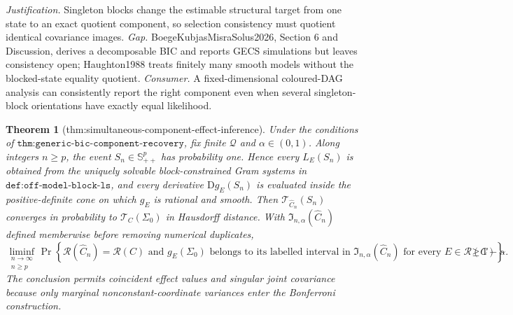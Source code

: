 \documentclass{article}
\newtheorem{theorem}{Theorem}
\begin{document}
\par\smallskip\noindent \textit{Justification.} Singleton blocks change the estimable structural target from one state to an exact quotient component, so selection consistency must quotient identical covariance images. \textit{Gap.} BoegeKubjasMisraSolus2026, Section 6 and Discussion, derives a decomposable BIC and reports GECS simulations but leaves consistency open; Haughton1988 treats finitely many smooth models without the blocked-state equality quotient. \textit{Consumer.} A fixed-dimensional coloured-DAG analysis can consistently report the right component even when several singleton-block orientations have exactly equal likelihood.

\begin{theorem}[thm:simultaneous-component-effect-inference]\label{thm:simultaneous-component-effect-inference}
Under the conditions of \(\texttt{thm:generic-bic-component-recovery}\), fix finite \(\mathcal Q\) and \(\alpha\in(0,1)\). Along integers \(n\geq p\), the event \(S_n\in\mathbb S^p_{++}\) has probability one. Hence every \(L_E(S_n)\) is obtained from the uniquely solvable block-constrained Gram systems in \(\texttt{def:off-model-block-ls}\), and every derivative \(\mathrm D g_E(S_n)\) is evaluated inside the positive-definite cone on which \(g_E\) is rational and smooth. Then \(\mathcal T_{\widehat C_n}(S_n)\) converges in probability to \(\mathcal T_C(\Sigma_0)\) in Hausdorff distance. With \(\mathfrak I_{n,\alpha}(\widehat C_n)\) defined memberwise before removing numerical duplicates, \[\liminf_{\substack{n\to\infty\\ n\geq p}}\Pr\left\{\mathcal R(\widehat C_n)=\mathcal R(C)\text{ and }g_E(\Sigma_0)\text{ belongs to its labelled interval in }\mathfrak I_{n,\alpha}(\widehat C_n)\text{ for every }E\in\mathcal R(C)\right\}\geq1-\alpha.\] The conclusion permits coincident effect values and singular joint covariance because only marginal nonconstant-coordinate variances enter the Bonferroni construction.
\end{theorem}
\end{document}
